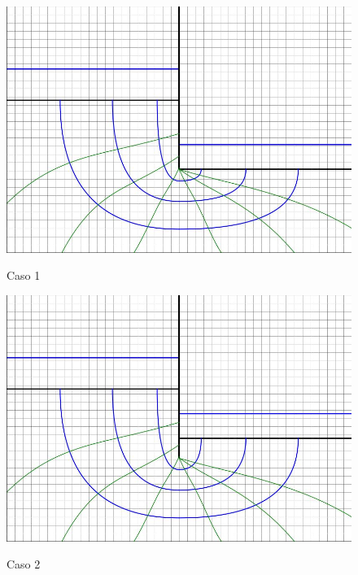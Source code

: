 \begin{figure}[H]
    \centering
    \begin{minipage}{0.32\textwidth}
        \centering
        \includegraphics[width=\textwidth]{GRAFICOS/caso_1.jpg}
        \caption{Caso 1}
        \label{fig:caso_1}
    \end{minipage}
    \begin{minipage}{0.32\textwidth}
        \centering
        \includegraphics[width=\textwidth]{GRAFICOS/caso_2.jpg}
        \caption{Caso 2}
        \label{fig:caso_2}
    \end{minipage}
    \begin{minipage}{0.32\textwidth}
        \centering

\end{minipage}
\end{figure}
